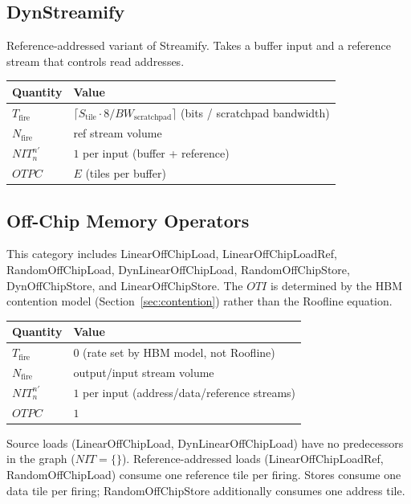 \documentclass[10pt]{article}
\begin{document}
\subsection{DynStreamify}

Reference-addressed variant of Streamify. Takes a buffer input and a reference stream that controls read addresses.

\begin{table}[h]
\centering
\begin{tabular}{@{}ll@{}}
\toprule
\textbf{Quantity} & \textbf{Value} \\
\midrule
$T_{\text{fire}}$ & $\lceil S_{\text{tile}} \cdot 8 / \mathit{BW}_{\text{scratchpad}}\rceil$ \quad (bits / scratchpad bandwidth) \\
$N_{\text{fire}}$ & ref stream volume \\
$\mathit{NIT}^{n'}_n$ & $1$ per input (buffer + reference) \\
$\mathit{OTPC}$ & $E$ \quad (tiles per buffer) \\
\bottomrule
\end{tabular}
\end{table}

\subsection{Off-Chip Memory Operators}

This category includes LinearOffChipLoad, LinearOffChipLoadRef, RandomOffChipLoad, DynLinearOffChipLoad, RandomOffChipStore, DynOffChipStore, and LinearOffChipStore. The $\mathit{OTI}$ is determined by the HBM contention model (Section~\ref{sec:contention}) rather than the Roofline equation.

\begin{table}[h]
\centering
\begin{tabular}{@{}ll@{}}
\toprule
\textbf{Quantity} & \textbf{Value} \\
\midrule
$T_{\text{fire}}$ & $0$ \quad (rate set by HBM model, not Roofline) \\
$N_{\text{fire}}$ & output/input stream volume \\
$\mathit{NIT}^{n'}_n$ & $1$ per input (address/data/reference streams) \\
$\mathit{OTPC}$ & $1$ \\
\bottomrule
\end{tabular}
\end{table}

Source loads (LinearOffChipLoad, DynLinearOffChipLoad) have no predecessors in the graph ($\mathit{NIT} = \{\}$). Reference-addressed loads (LinearOffChipLoadRef, RandomOffChipLoad) consume one reference tile per firing. Stores consume one data tile per firing; RandomOffChipStore additionally consumes one address tile.
\end{document}
